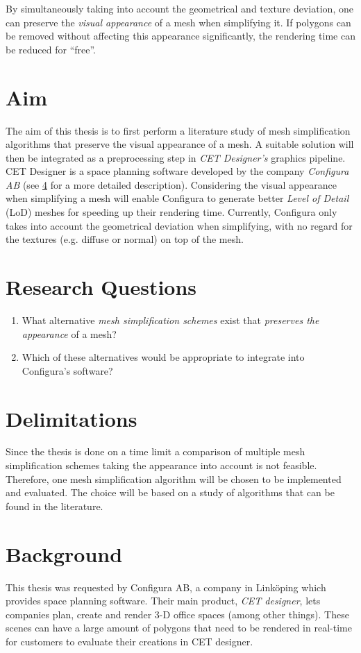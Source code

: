 By simultaneously taking into account the geometrical and texture deviation, one can preserve the \emph{visual appearance} of a mesh when simplifying it. If polygons can be removed without affecting this appearance significantly, the rendering time can be reduced for ``free''.

\section{Aim} \label{sec:aim}
The aim of this thesis is to first perform a literature study of mesh simplification algorithms that preserve the visual appearance of a mesh. A suitable solution will then be integrated as a preprocessing step in \emph{CET Designer's} graphics pipeline. CET Designer is a space planning software developed by the company \emph{Configura AB} (see \cref{sec:background} for a more detailed description). Considering the visual appearance when simplifying a mesh will enable Configura to generate better \emph{Level of Detail} (LoD) meshes for speeding up their rendering time. Currently, Configura only takes into account the geometrical deviation when simplifying, with no regard for the textures (e.g. diffuse or normal) on top of the mesh.


\section{Research Questions} \label{sec:research-questions}
\begin{enumerate}
\item What alternative \emph{mesh simplification schemes} exist that \emph{preserves the appearance} of a mesh? 
\item Which of these alternatives would be appropriate to integrate into Configura's software?
\end{enumerate}

\section{Delimitations} \label{sec:delimitations}
Since the thesis is done on a time limit a comparison of multiple mesh simplification schemes taking the appearance into account is not feasible. Therefore, one mesh simplification algorithm will be chosen to be implemented and evaluated. The choice will be based on a study of algorithms that can be found in the literature.

\section{Background} \label{sec:background}
This thesis was requested by Configura AB, a company in Linköping which provides space planning software. Their main product, \emph{CET designer}, lets companies plan, create and render 3-D office spaces (among other things). These scenes can have a large amount of polygons that need to be rendered in real-time for customers to evaluate their creations in CET designer. 

